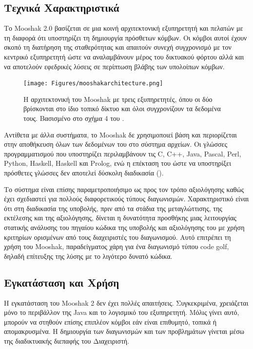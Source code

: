 \documentclass[diploma]{softlab-thesis}
\begin{document}
\subsection{Τεχνικά Χαρακτηριστικά}

Το Mooshak 2.0 βασίζεται σε μια κοινή αρχιτεκτονική εξυπηρετητή και πελατών με τη
διαφορά ότι υποστηρίζει τη δημιουργία πρόσθετων κόμβων. Οι κόμβοι αυτοί έχουν σκοπό
τη διατήρηση της σταθερότητας και απαιτούν συνεχή συγχρονισμό με τον κεντρικό
εξυπηρετητή ώστε να αναλαμβάνουν μέρος του δικτυακού φόρτου αλλά και να αποτελούν
εφεδρικές λύσεις σε περίπτωση βλάβης των υπολοίπων κόμβων.

\bigskip

\begin{figure}
  \centering
  \texttt{[image: Figures/mooshakarchitecture.png]}
  \caption[Η αρχιτεκτονική του Mooshak]{Η αρχιτεκτονική του Mooshak με τρεις
  εξυπηρετητές, όπου οι δύο βρίσκονται στο ίδιο τοπικό δίκτυο και όλοι
  συγχρονίζουν τα δεδομένα τους. Βασισμένο στο σχήμα 4 του
  \cite{leal2003mooshak}.}
\end{figure}

\bigskip

Αντίθετα με άλλα συστήματα, το Mooshak δε χρησιμοποιεί βάση και περιορίζεται
στην αποθήκευση όλων των δεδομένων του στο σύστημα αρχείων. Οι γλώσσες
προγραμματισμού που υποστηρίζει περιλαμβάνουν τις C, C++, Java, Pascal, Perl,
Python, Haskell, Haskell και Prolog, ενώ η επέκταση του ώστε να υποστηρίξει
πρόσθετες γλώσσες δεν αποτελεί δύσκολη διαδικασία (\cite{ribeiro2008early}).

\bigskip

Το σύστημα είναι επίσης παραμετροποιήσιμο ως προς τον τρόπο αξιολόγησης καθώς
έχει σχεδιαστεί για πολλούς διαφορετικούς τύπους διαγωνισμών. Χαρακτηριστικό
είναι ότι στη διαδικασία της υποβολής, πριν από τα στάδια της μεταγλώττισης,
της εκτέλεσης και της αξιολόγησης, δίνεται η δυνατότητα προσθήκης μιας
λειτουργίας στατικής ανάλυσης του πηγαίου κώδικα της υποβολής και αξιολόγησης
του με χρήση κριτηρίων ορισμένων από τους διαχειριστές του διαγωνισμού. Αυτό
επιτρέπει τη χρήση του Mooshak, παραδείγματος χάρη για ένα διαγωνισμό τύπου
code golf, δηλαδή επίτευξης της λύσης με το λιγότερο δυνατό κώδικα.

\subsection{Εγκατάσταση και Χρήση}

Η εγκατάσταση του Mooshak 2 δεν έχει πολλές απαιτήσεις. Συγκεκριμένα,
χρειάζεται μόνο το περιβάλλον της Java και το λογισμικό του εξυπηρετητή. Μόλις
γίνει αυτό, μπορούν να στηθούν επίσης επιπλέον κόμβοι εάν είναι επιθυμητό,
τοπικά ή απομακρυσμένα. Η δημιουργία των διαγωνισμών και των προβλημάτων
γίνεται μέσω της διαδικτυακής διεπαφής του Διαχειριστή.
\end{document}
